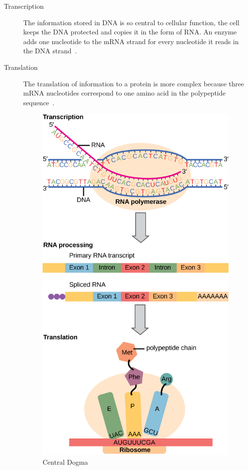 \begin{description}
\item [Transcription] The information stored in DNA is so central to cellular function, the cell keeps the DNA protected and copies it in the form of RNA. An enzyme adds one nucleotide to the mRNA strand for every nucleotide it reads in the DNA strand~\cite{cdogma2017}.
\item [Translation]  The translation of information to a protein is more complex because three mRNA nucleotides correspond to one amino acid in the polypeptide sequence~\cite{cdogma2017}.

\begin{figure}[htp]
\centering
\includegraphics[scale=1.00]{centraldogma.jpeg}
\caption{Central Dogma~\cite{cdogma2017}}
\label{cdog}
\end{figure}
\end{description}

